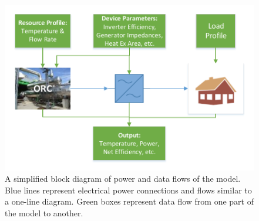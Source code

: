 \begin{figure}[h]
	\centering

	\includegraphics{figures/Abridged Pilgrim Model Flow diagram - AC bus.pdf} 

	\caption{A simplified block diagram of power and data flows of the model. Blue lines represent electrical power connections and flows similar to a one-line diagram. Green boxes represent data flow from one part of the model to another.}
	\label{fig:abridged_flow_diagram_label}

\end{figure}